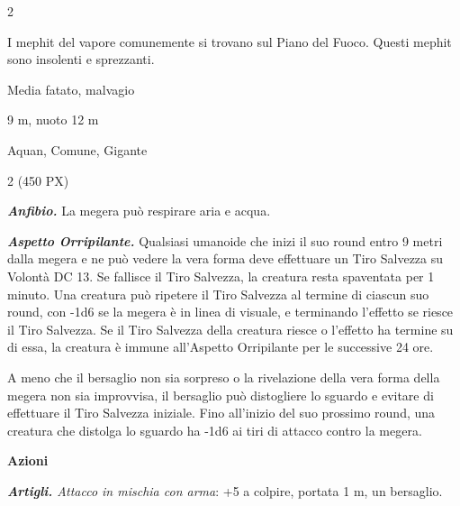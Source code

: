 \begin{multicols}{2}
{I mephit del vapore comunemente si trovano sul Piano del Fuoco. Questi mephit sono insolenti e sprezzanti.

\begin{description}[noitemsep, topsep=0pt, parsep=0pt, partopsep=0pt, itemsep=1pt, leftmargin=2.35cm,  labelwidth=2.2cm, itemindent=0cm, listparindent=0pt] %
\setlength{\baselineskip}{10pt}
\item[\textbf{Taglia/Tipo}] Media fatato, malvagio
\item[\textbf{Caratt.}] 
\item[\textbf{Punti Ferita}] 
\item[\textbf{Movimento}] 9 m, nuoto 12 m
\item[\textbf{Tiri Salvez.}] 
\item[\textbf{Sensi}] 
\item[\textbf{Linguaggi}] Aquan, Comune, Gigante
\item[\textbf{Sfida}] 2 (450 PX)
\end{description}
\smallskip

\emph{\textbf{Anfibio.}} La megera può respirare aria e acqua.

\emph{\textbf{Aspetto Orripilante.}} Qualsiasi umanoide che inizi il suo round entro 9 metri dalla megera e ne può vedere la vera forma deve effettuare un Tiro Salvezza su Volontà DC 13. Se fallisce il Tiro Salvezza, la creatura resta spaventata per 1 minuto. Una creatura può ripetere il Tiro Salvezza al termine di ciascun suo round, con -1d6 se la megera è in linea di visuale, e terminando l'effetto se riesce il Tiro Salvezza. Se il Tiro Salvezza della creatura riesce o l'effetto ha termine su di essa, la creatura è immune all'Aspetto Orripilante per le successive 24 ore.

A meno che il bersaglio non sia sorpreso o la rivelazione della vera forma della megera non sia improvvisa, il bersaglio può distogliere lo sguardo e evitare di effettuare il Tiro Salvezza iniziale. Fino all'inizio del suo prossimo round, una creatura che distolga lo sguardo ha -1d6 ai tiri di attacco contro la megera.

\textbf{Azioni}

\emph{\textbf{Artigli.} Attacco in mischia con arma}: +5 a colpire, portata 1 m, un bersaglio.

}
\end{multicols}
